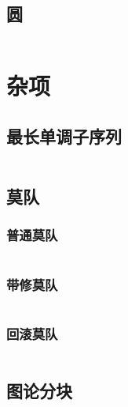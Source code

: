 \documentclass[utf8]{ctexart}
\newcommand{\cpp}[1]{\inputminted[linenos,breaklines,tabsize=4,mathescape]{c++}{#1}}
\begin{document}
\subsection{圆}
\cpp{codes/computational-geometry/circle.cpp}




\section{杂项}

\subsection{最长单调子序列}
\cpp{codes/misc/lis.cpp}

\subsection{莫队}

\subsubsection{普通莫队}
\cpp{codes/misc/mo.cpp}

\subsubsection{带修莫队}
\cpp{codes/misc/modifiable-mo.cpp}

\subsubsection{回滚莫队}
\cpp{codes/misc/rollback-mo.cpp}

\subsection{图论分块}
\cpp{codes/misc/graph-block.cpp}
\end{document}
